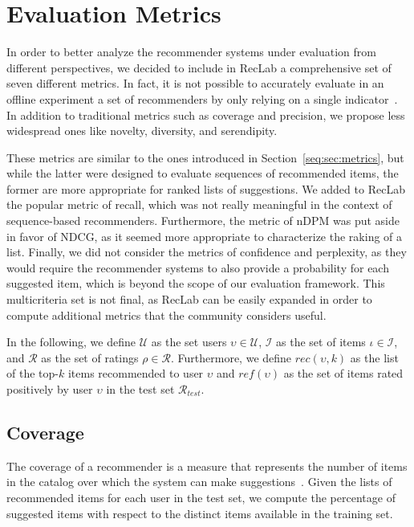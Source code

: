 \section{Evaluation Metrics}
\label{lab:sec:metrics}

In order to better analyze the recommender systems under evaluation from different perspectives, we decided to include in RecLab a comprehensive set of seven different metrics. In fact, it is not possible to accurately evaluate in an offline experiment a set of recommenders by only relying on a single indicator~\cite{Herlocker2004}. In addition to traditional metrics such as coverage and precision, we propose less widespread ones like novelty, diversity, and serendipity.

These metrics are similar to the ones introduced in Section~\ref{seq:sec:metrics}, but while the latter were designed to evaluate sequences of recommended items, the former are more appropriate for ranked lists of suggestions. We added to RecLab the popular metric of recall, which was not really meaningful in the context of sequence-based recommenders. Furthermore, the metric of nDPM was put aside in favor of NDCG, as it seemed more appropriate to characterize the raking of a list. Finally, we did not consider the metrics of confidence and perplexity, as they would require the recommender systems to also provide a probability for each suggested item, which is beyond the scope of our evaluation framework. This multicriteria set is not final, as RecLab can be easily expanded in order to compute additional metrics that the community considers useful.

In the following, we define $\mathcal{U}$ as the set users $\upsilon \in \mathcal{U}$, $\mathcal{I}$ as the set of items $\iota \in \mathcal{I}$, and $\mathcal{R}$ as the set of ratings $\rho \in \mathcal{R}$. Furthermore, we define $rec(\upsilon, k)$ as the list of the top-$k$ items recommended to user $\upsilon$ and $ref(\upsilon)$ as the set of items rated positively by user $\upsilon$ in the test set $\mathcal{R}_{test}$.

\subsection{Coverage}
The coverage of a recommender is a measure that represents the number of items in the catalog over which the system can make suggestions~\cite{Gunawardana2015}. Given the lists of recommended items for each user in the test set, we compute the percentage of suggested items with respect to the distinct items available in the training set.

